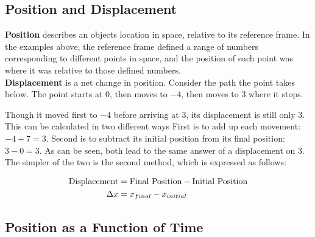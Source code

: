 \documentclass{article}
\begin{document}
\subsection{Position and Displacement}
\textbf{Position} describes an objects location in space, relative to its reference frame.
In the examples above, the reference frame defined a range of numbers corresponding to different
points in space, and the position of each point was where it was relative to those defined
numbers.
\\[12pt]
\textbf{Displacement} is a net change in position. Consider the path the point takes below.
The point starts at $0$, then moves to $-4$, then moves to $3$ where it stops. 

\begin{center}
\end{center}

Though it moved first to $-4$ before arriving at $3$, its displacement is still only $3$. This can be calculated
in two different ways First is to add up each movement: $-4+7=3$. Second is to subtract
its initial position from its final position: $3-0=3$. As can be seen, both lead to the same
answer of a displacement on $3$. The simpler of the two is the second method, which is expressed
as follows:

\begin{equation} \label{Displacement Equation}
  \begin{split}
    \textup{Displacement} & = \textup{Final Position} - \textup{Initial Position} \\
    \Delta x & = x_{final} - x_{initial}
  \end{split}
\end{equation}

\subsection{Position as a Function of Time}
\end{document}
